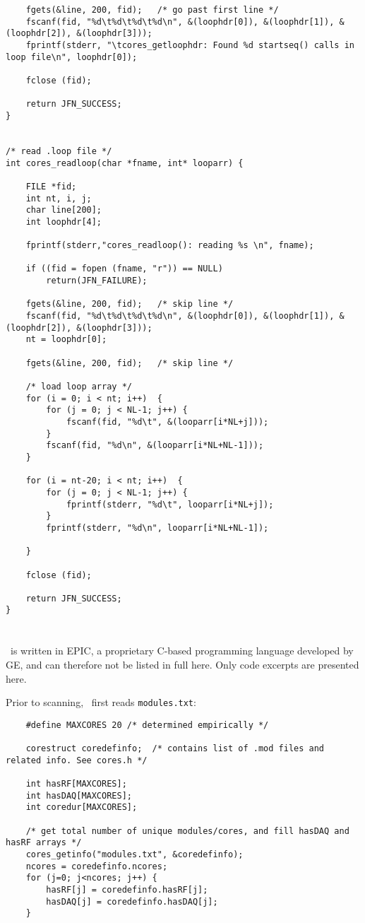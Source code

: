\begin{lstlisting}
	fgets(&line, 200, fid);   /* go past first line */
	fscanf(fid, "%d\t%d\t%d\t%d\n", &(loophdr[0]), &(loophdr[1]), &(loophdr[2]), &(loophdr[3])); 
	fprintf(stderr, "\tcores_getloophdr: Found %d startseq() calls in loop file\n", loophdr[0]);

	fclose (fid);

	return JFN_SUCCESS;
}


/* read .loop file */
int cores_readloop(char *fname, int* looparr) {

	FILE *fid;
	int nt, i, j;
	char line[200];
	int loophdr[4];

	fprintf(stderr,"cores_readloop(): reading %s \n", fname);

	if ((fid = fopen (fname, "r")) == NULL)
		return(JFN_FAILURE);

	fgets(&line, 200, fid);   /* skip line */
	fscanf(fid, "%d\t%d\t%d\t%d\n", &(loophdr[0]), &(loophdr[1]), &(loophdr[2]), &(loophdr[3])); 
	nt = loophdr[0];

	fgets(&line, 200, fid);   /* skip line */

	/* load loop array */
	for (i = 0; i < nt; i++)  {
		for (j = 0; j < NL-1; j++) {	
			fscanf(fid, "%d\t", &(looparr[i*NL+j]));
		}
		fscanf(fid, "%d\n", &(looparr[i*NL+NL-1]));
	}

	for (i = nt-20; i < nt; i++)  {
		for (j = 0; j < NL-1; j++) {	
			fprintf(stderr, "%d\t", looparr[i*NL+j]);
		}
		fprintf(stderr, "%d\n", looparr[i*NL+NL-1]);

	}

	fclose (fid);

	return JFN_SUCCESS;
}

\end{lstlisting}


\section{ \toppe }

\toppe~is written in EPIC, a proprietary C-based programming language developed by GE, and can therefore not be listed in full here.
Only code excerpts are presented here.

Prior to scanning, \toppe~first reads {\tt modules.txt}:

\begin{lstlisting}
	#define MAXCORES 20 /* determined empirically */

	corestruct coredefinfo;  /* contains list of .mod files and related info. See cores.h */

	int hasRF[MAXCORES]; 
	int hasDAQ[MAXCORES];
	int coredur[MAXCORES];

	/* get total number of unique modules/cores, and fill hasDAQ and hasRF arrays */
	cores_getinfo("modules.txt", &coredefinfo);
	ncores = coredefinfo.ncores;
	for (j=0; j<ncores; j++) {
		hasRF[j] = coredefinfo.hasRF[j];
		hasDAQ[j] = coredefinfo.hasDAQ[j];
	}

\end{lstlisting}

